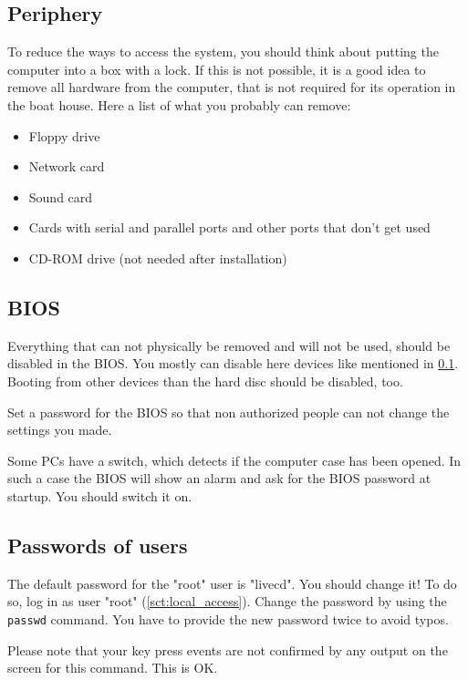 \documentclass[a4paper,12pt,twoside]{article}
\begin{document}
\subsection{Periphery}
\label{sct:periphery}
To reduce the ways to access the system, you should think about putting
the computer into a box with a lock. If this is not possible, it is a 
good idea to remove all hardware from the computer, that is not
required for its operation in the boat house. Here a list of what you
probably can remove:

\begin{itemize}
    \item Floppy drive
    \item Network card
    \item Sound card
    \item Cards with serial and parallel ports and other ports that
        don't get used
    \item CD-ROM drive (not needed after installation)
\end{itemize}


\subsection{BIOS}
\label{sct:bios}
Everything that can not physically be removed and will not be used,
should be disabled in the BIOS. You mostly can disable here devices
like mentioned in \ref{sct:periphery}. Booting from other devices than 
the hard disc should be disabled, too.

Set a password for the BIOS so that non authorized people can not change
the settings you made.

Some PCs have a switch, which detects if the computer case has been
opened. In such a case the BIOS will show an alarm and ask for the BIOS
password at startup. You should switch it on.


\subsection{Passwords of users}
\label{sct:password_admin}
The default password for the "root" user is
"livecd". You should change it! To do so,
log in as user "root" (\ref{sct:local_access}). Change the
password by using the \texttt{passwd} command. You
have to provide the new password twice to avoid typos.

Please note that your key press events are not confirmed by any output
on the screen for this command. This is OK.
\end{document}
